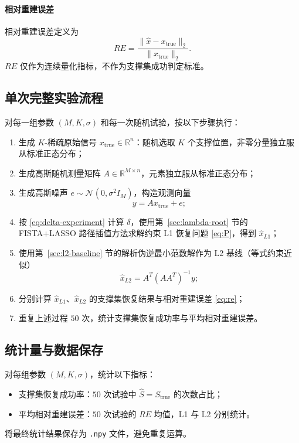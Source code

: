 \documentclass[UTF8]{ctexart}
\numberwithin{figure}{section}
\theoremstyle{definition}
\theoremstyle{examplestyle}
\theoremstyle{remark}
\begin{document}
\paragraph*{相对重建误差}
相对重建误差定义为
\begin{equation}
\label{eq:re}
RE=\frac{\|\hat{x}-x_{\mathrm{true}}\|_2}{\|x_{\mathrm{true}}\|_2}.
\end{equation}
$RE$ 仅作为连续量化指标，不作为支撑集成功判定标准。

\subsection{单次完整实验流程}
\label{sec:single-run}

对每一组参数 $(M,K,\sigma)$ 和每一次随机试验，按以下步骤执行：
\begin{enumerate}
\item 生成 $K$-稀疏原始信号 $x_{\mathrm{true}}\in\mathbb{R}^n$：随机选取 $K$ 个支撑位置，非零分量独立服从标准正态分布；
\item 生成高斯随机测量矩阵 $A\in\mathbb{R}^{M\times n}$，元素独立服从标准正态分布；
\item 生成高斯噪声 $e\sim\mathcal{N}(0,\sigma^2I_M)$，构造观测向量
\[
y=Ax_{\mathrm{true}}+e;
\]
\item 按 \eqref{eq:delta-experiment} 计算 $\delta$，使用第~\ref{sec:lambda-root} 节的 FISTA+LASSO 路径插值方法求解约束 L1 恢复问题 \eqref{eq:P}，得到 $\hat{x}_{L1}$；
\item 使用第~\ref{sec:l2-baseline} 节的解析伪逆最小范数解作为 L2 基线（等式约束近似）
\[
\hat{x}_{L2}=A^T(AA^T)^{-1}y;
\]
\item 分别计算 $\hat{x}_{L1}$、$\hat{x}_{L2}$ 的支撑集恢复结果与相对重建误差 \eqref{eq:re}；
\item 重复上述过程 $50$ 次，统计支撑集恢复成功率与平均相对重建误差。
\end{enumerate}

\subsection{统计量与数据保存}
\label{sec:stats-save}

对每组参数 $(M,K,\sigma)$，统计以下指标：
\begin{itemize}
\item 支撑集恢复成功率：$50$ 次试验中 $\hat{S}=S_{\mathrm{true}}$ 的次数占比；
\item 平均相对重建误差：$50$ 次试验的 $RE$ 均值，L1 与 L2 分别统计。
\end{itemize}
将最终统计结果保存为 \texttt{.npy} 文件，避免重复运算。
\end{document}
